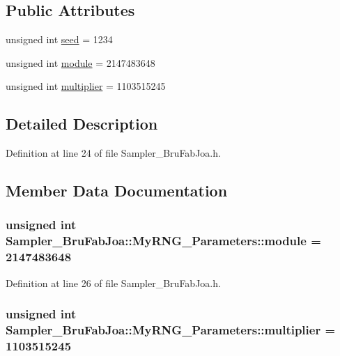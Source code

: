 \subsection*{Public Attributes}
\begin{DoxyCompactItemize}
\item 
unsigned int \hyperlink{struct_sampler___bru_fab_joa_1_1_my_r_n_g___parameters_aae0b56abe1943b1519648d7a0b7b2bd6}{seed} = 1234
\item 
unsigned int \hyperlink{struct_sampler___bru_fab_joa_1_1_my_r_n_g___parameters_abebe2672fd88735557235c078b0abdbe}{module} = 2147483648
\item 
unsigned int \hyperlink{struct_sampler___bru_fab_joa_1_1_my_r_n_g___parameters_a5c7fc28d889e0751c9f61922834fd955}{multiplier} = 1103515245
\end{DoxyCompactItemize}


\subsection{Detailed Description}


Definition at line 24 of file Sampler\-\_\-\-Bru\-Fab\-Joa.\-h.



\subsection{Member Data Documentation}
\hypertarget{struct_sampler___bru_fab_joa_1_1_my_r_n_g___parameters_abebe2672fd88735557235c078b0abdbe}{
\subsubsection[{module}]{\setlength{\rightskip}{0pt plus 5cm}unsigned int Sampler\-\_\-\-Bru\-Fab\-Joa\-::\-My\-R\-N\-G\-\_\-\-Parameters\-::module = 2147483648}}\label{struct_sampler___bru_fab_joa_1_1_my_r_n_g___parameters_abebe2672fd88735557235c078b0abdbe}


Definition at line 26 of file Sampler\-\_\-\-Bru\-Fab\-Joa.\-h.

\hypertarget{struct_sampler___bru_fab_joa_1_1_my_r_n_g___parameters_a5c7fc28d889e0751c9f61922834fd955}{
\subsubsection[{multiplier}]{\setlength{\rightskip}{0pt plus 5cm}unsigned int Sampler\-\_\-\-Bru\-Fab\-Joa\-::\-My\-R\-N\-G\-\_\-\-Parameters\-::multiplier = 1103515245}}\label{struct_sampler___bru_fab_joa_1_1_my_r_n_g___parameters_a5c7fc28d889e0751c9f61922834fd955}


